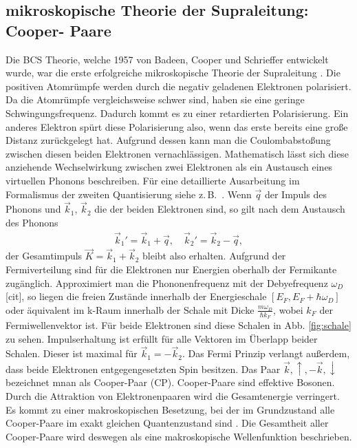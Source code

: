 \documentclass[twoside,        %
               BCOR12mm,       %
               english,ngerman, %
               fleqn,headsepline=false,footsepline=false
              ]{Vorlage/MFPREPORT}
\newcommand{\zB}{z.\,B.\ }
\begin{document}
\subsection{mikroskopische Theorie der Supraleitung: Cooper- Paare}
Die BCS Theorie, welche 1957 von Badeen, Cooper und Schrieffer entwickelt
wurde, war die erste erfolgreiche mikroskopische Theorie der Supraleitung
\cite[Kap.]{buckel2013supraleitung}. Die positiven Atomrümpfe werden durch die
negativ geladenen Elektronen polarisiert. Da die Atomrümpfe vergleichsweise
schwer sind, haben sie eine geringe Schwingungsfrequenz. Dadurch kommt es zu
einer retardierten Polarisierung. Ein anderes Elektron spürt diese
Polarisierung also, wenn das erste bereits eine große Distanz zurückgelegt hat.
Aufgrund dessen kann man die Coulombabstoßung zwischen diesen beiden Elektronen
vernachlässigen. Mathematisch lässt sich diese anziehende Wechselwirkung
zwischen zwei Elektronen als ein Austausch eines virtuellen Phonons
beschreiben. Für eine detaillierte Ausarbeitung im Formalismus der zweiten
Quantisierung siehe \zB \cite[Kap.]{enss2011tieftemperaturphysik}.
Wenn $\vec q$ der Impuls des Phonons und $\vec k_1$, $\vec k_2$ die der beiden Elektronen
sind, so gilt nach dem Austausch des Phonons
\cite[S.]{enss2011tieftemperaturphysik}
\begin{align}
    \label{eq:phononimp}
    \vec k_1'=\vec k_1 +\vec q, \quad \vec k_2'=\vec k_2 -\vec q,
\end{align}
der Gesamtimpuls $\vec K=\vec k_1 + \vec k_2$ bleibt also erhalten.
Aufgrund der Fermiverteilung sind für die Elektronen nur Energien oberhalb der
Fermikante zugänglich. Approximiert man die Phononenfrequenz mit der
Debyefrequenz $\omega_D$ [cit], so liegen die freien Zustände innerhalb der
Energieschale $[E_F,E_F+\hbar \omega_D]$ oder äquivalent im k-Raum innerhalb
der Schale mit Dicke $\frac{m\omega_D}{\hbar k_F}$, wobei $k_F$ der
Fermiwellenvektor ist. Für beide Elektronen sind diese Schalen in Abb.
\ref{fig:schale} zu sehen. Impulserhaltung ist erfüllt für alle Vektoren im
Überlapp beider Schalen. Dieser ist maximal für $\vec k_1 = -\vec k_2$. Das
Fermi Prinzip verlangt außerdem, dass beide Elektronen entgegengesetzten Spin
besitzen. Das Paar ${\vec k,\uparrow},{-\vec k,\downarrow}$ bezeichnet mnan als
Cooper-Paar (CP). Cooper-Paare sind effektive Bosonen. Durch die Attraktion von
Elektronenpaaren wird die Gesamtenergie verringert. Es kommt zu einer
makroskopischen Besetzung, bei der im Grundzustand alle Cooper-Paare im exakt gleichen
Quantenzustand sind \cite[Kap. 2.2]{buckel2013supraleitung}. Die Gesamtheit
aller Cooper-Paare wird deswegen als eine makroskopische Wellenfunktion
beschrieben.
\end{document}

